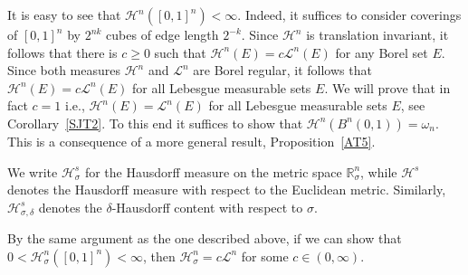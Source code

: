 \documentclass[12pt,leqno]{amsart}
\theoremstyle{definition}
\newcommand{\bbbr}{\mathbb R}
\def\H{{\mathcal H}}
\def\LL{{\mathcal L}}
\numberwithin{theorem}{section} \numberwithin{equation}{section}
\begin{document}
It is easy to see that $\H^n([0,1]^n)<\infty$. Indeed, it suffices to consider coverings of $[0,1]^n$ by $2^{nk}$ cubes of edge length $2^{-k}$. Since $\H^n$ is translation invariant, it follows that there is $c\geq 0$ such that $\H^n(E)=c\LL^n(E)$ for any Borel set $E$. Since both measures $\H^n$ and $\LL^n$ are Borel regular, it follows that $\H^n(E)=c\LL^n(E)$ for all Lebesgue measurable sets $E$. We will prove that in fact $c=1$ i.e., $\H^n(E)=\LL^n(E)$ for all Lebesgue measurable sets $E$, see Corollary~\ref{SJT2}. To this end it suffices to show that $\H^n(B^n(0,1))=\omega_n$. This is a consequence of a more general result, Proposition~\ref{AT5}.

We write $\H^s_\sigma$ for the Hausdorff measure on the metric space $\bbbr^n_\sigma$, while $\H^s$ denotes the Hausdorff measure with respect to the Euclidean metric. Similarly, $\H^s_{\sigma,\delta}$ denotes the $\delta$-Hausdorff content with respect to $\sigma$.

By the same argument as the one described above, if we can show that $0<\H^n_\sigma([0,1]^n)<\infty$, then $\H^n_\sigma=c\LL^n$ for some $c\in (0,\infty)$.
\end{document}

